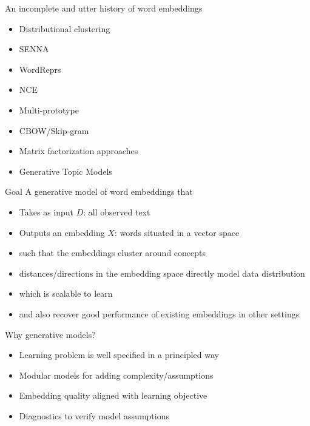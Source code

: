 \documentclass{beamer}
\begin{document}
\begin{frame}{An incomplete and utter history of word embeddings}
  \begin{itemize}
    \item Distributional clustering \cite{Lillian}
    \item SENNA \cite{Collobert}
    \item WordReprs \cite{Turian}
    \item NCE \cite{Mnih}
    \item Multi-prototype \cite{Socher}
    \item CBOW/Skip-gram \cite{CBOW}
    \item Matrix factorization approaches \cite{Moitra}
    \item Generative Topic Models \cite{LDA}
  \end{itemize}
\end{frame}

\begin{frame}{Goal}
A generative model of word embeddings that
\begin{itemize}
\item Takes as input $D$: all observed text
\item Outputs an embedding $X$: words situated in a vector space
\item such that the embeddings cluster around concepts
\item distances/directions in the embedding space directly model data distribution
\item which is scalable to learn
\item and also recover good performance of existing embeddings in other settings
\end{itemize}
\end{frame}

\begin{frame}{Why generative models?}
  \begin{itemize}
    \item Learning problem is well specified in a principled way
    \item Modular models for adding complexity/assumptions
    \item Embedding quality aligned with learning objective
    \item Diagnostics to verify model assumptions
  \end{itemize}
\end{frame}
\end{document}

